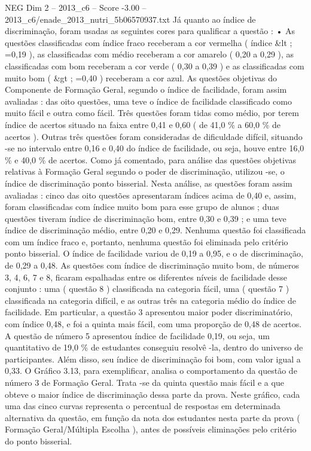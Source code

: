 \begin{textsample}{NEG Dim 2 – 2013\_c6 – Score -3.00 – 2013\_c6/enade\_2013\_nutri\_5b06570937.txt}
Já quanto ao índice de discriminação, foram usadas as seguintes cores para qualificar a questão : • As questões classificadas com índice fraco receberam a cor vermelha ( índice \&lt ; =0,19 ), as classificadas com médio receberam a cor amarelo ( 0,20 a 0,29 ), as classificadas com bom receberam a cor verde ( 0,30 a 0,39 ) e as classificadas com muito bom ( \&gt ; =0,40 ) receberam a cor azul.
As questões objetivas do Componente de Formação Geral, segundo o índice de facilidade, foram assim avaliadas : das oito questões, uma teve o índice de facilidade classificado como muito fácil e outra como fácil.
Três questões foram tidas como médio, por terem índice de acertos situado na faixa entre 0,41 e 0,60 ( de 41,0 \% a 60,0 \% de acertos ).
Outras três questões foram consideradas de dificuldade difícil, situando -se no intervalo entre 0,16 e 0,40 do índice de facilidade, ou seja, houve entre 16,0 \% e 40,0 \% de acertos.
Como já comentado, para análise das questões objetivas relativas à Formação Geral segundo o poder de discriminação, utilizou -se, o índice de discriminação ponto bisserial.
Nesta análise, as questões foram assim avaliadas : cinco das oito questões apresentaram índices acima de 0,40 e, assim, foram classificadas com índice muito bom para esse grupo de alunos ; duas questões tiveram índice de discriminação bom, entre 0,30 e 0,39 ; e uma teve índice de discriminação médio, entre 0,20 e 0,29.
Nenhuma questão foi classificada com um índice fraco e, portanto, nenhuma questão foi eliminada pelo critério ponto bisserial.
O índice de facilidade variou de 0,19 a 0,95, e o de discriminação, de 0,29 a 0,48.
As questões com índice de discriminação muito bom, de números 3, 4, 6, 7 e 8, ficaram espalhadas entre os diferentes níveis de facilidade desse conjunto : uma ( questão 8 ) classificada na categoria fácil, uma ( questão 7 ) classificada na categoria difícil, e as outras três na categoria médio do índice de facilidade.
Em particular, a questão 3 apresentou maior poder discriminatório, com índice 0,48, e foi a quinta mais fácil, com uma proporção de 0,48 de acertos.
A questão de número 5 apresentou índice de facilidade 0,19, ou seja, um quantitativo de 19,0 \% de estudantes conseguiu resolvê -la, dentro do universo de participantes.
Além disso, seu índice de discriminação foi bom, com valor igual a 0,33.
O Gráfico 3.13, para exemplificar, analisa o comportamento da questão de número 3 de Formação Geral.
Trata -se da quinta questão mais fácil e a que obteve o maior índice de discriminação dessa parte da prova.
Neste gráfico, cada uma das cinco curvas representa o percentual de respostas em determinada alternativa da questão, em função da nota dos estudantes nesta parte da prova ( Formação Geral/Múltipla Escolha ), antes de possíveis eliminações pelo critério do ponto bisserial.

\end{textsample}
